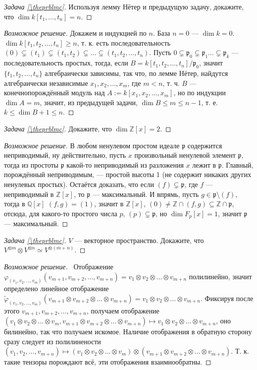 \documentclass{article}
\theoremstyle{definition}
\theoremstyle{remark}
\newenvironment{solution}
{\begin{proof}[Возможное решение]}
{\end{proof}}
\newcounter{prblmc}
\newenvironment{prblm}
{\renewcommand{\qedsymbol}{}\begin{proof}[Задача \rm{\ref{\theprblmc}}]}
{\stepcounter{prblmc} \end{proof}}
\newcommand{\Z}{\mathbb{Z}}
\newcommand{\Q}{\mathbb{Q}}
\newcommand{\p}{\mathfrak{p}}
\begin{document}
\begin{prblm}
    Используя лемму Нётер и предыдущую задачу, докажите, что $\dim k[t_1, \hdots, t_n] = n$.
\end{prblm}
\begin{solution}
	Докажем и нндукцией по $n$. База $n = 0$ --- $\dim k = 0$. $\dim k[t_1, t_2, \ldots, t_n] \ge n$, т. к. есть последовательность $(0) \subsetneq (t_1) \subsetneq (t_1, t_2) \subsetneq \ldots \subsetneq (t_1, t_2, \ldots, t_n)$. Пусть $0 \subsetneq \p_0 \subsetneq \p_1 \ldots \subsetneq \p_k$ --- последовательность простых, тогда, если $B = k[t_1, t_2, \ldots, t_n] / \p_0$, значит $\{t_1, t_2, \ldots, t_n\}$ алгебраически зависимы, так что, по лемме Нётер, найдутся алгебраически независимые $x_1, x_2, \ldots, x_m$, где $m < n$, т. ч. $B$ --- конечнопорождённый модуль над $A := k[x_1, x_2, \ldots, x_m]$, но по индукции $\dim A = m$, значит, из предыдущей задачи, $\dim B \le m \le n - 1$, т. е. $k \le \dim B + 1 \le n$.
\end{solution}

\begin{prblm}
    Докажите, что $\dim \Z[x] = 2$.
\end{prblm}
\begin{solution}
	В любом ненулевом простом идеале $\p$ содержится неприводимый, ну действительно, пусть $x$ произвольный ненулевой элемент $\p$, тогда из простоты $\p$ какой-то неприводимый из разложения $x$ лежит в $\p$. Главный, порождённый неприводимым, --- простой высоты 1 (не содержит никаких других ненулевых простых). Остаётся доказать, что если $(f) \subsetneq \p$, где $f$ --- неприводимый в $\Z[x]$, то $\p$ --- максимальный. И впрямь, пусть $g \in \p \setminus (f)$, тогда в $\Q[x]$ $(f, g) = (1)$, значит в $\Z[x]$, $(0) \neq \Z \cap (f, g) \subseteq \Z \cap \p$, отсюда, для какого-то простого числа $p$, $(p) \subsetneq \p$, но $\dim F_p[x] = 1$, значит $\p$ --- максимальный.
\end{solution}

\begin{prblm}
    $V$ --- векторное пространство. Докажите, что $V^{\otimes m} \otimes V^{\otimes n} \simeq V^{\otimes (m + n)}$.
\end{prblm}
\begin{solution}
	\, Отображение $\varphi_{(v_1, v_2, \ldots, v_m)}(v_{m + 1}, v_{m + 2}, \ldots, \allowbreak v_{m + n}) = v_1 \otimes v_2 \otimes \ldots \otimes v_{m + n}$ полилинейно, значит определено линейное отображение $\tilde{\varphi}_{(v_1, v_2, \ldots, v_m)}(v_{m + 1} \otimes v_{m + 2} \otimes \ldots \otimes v_{m + n}) = v_1 \otimes v_2 \otimes \ldots \otimes v_{m + n}$. Фиксируя после этого $v_{m + 1}, v_{m + 2}, \ldots, v_{m + n}$, получаем отображение $(v_1 \otimes v_2 \otimes \ldots \otimes v_m, v_{m + 1} \otimes v_{m + 2} \otimes \ldots \otimes v_{m + n}) \mapsto v_1 \otimes v_2 \otimes \ldots \otimes v_{m + n}$, оно билинейно, так что получаем искомое. Наличие отображения в обратную сторону сразу следует из полилинености $(v_1, v_2, \ldots, v_{m + n}) \mapsto (v_1 \otimes v_2 \otimes \ldots \otimes v_m) \otimes (v_{m + 1} \otimes v_{m + 2} \otimes \ldots \otimes v_{m + n})$. Т. к. такие тензоры порождают всё, эти отображения взаимнообратны.
\end{solution}
\end{document}
